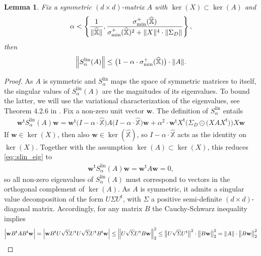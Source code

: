 \documentclass{article}
\newcommand*{\bbX}{\mathbb{X}}
\newcommand*{\bfw}{\mathbf{w}}
\newcommand*{\tran}{^{\mathsf{t}}}
\newcommand*{\sigminp}{\sigma_{\mathrm{min}}^+}
\DeclarePairedDelimiter{\abs}{\lvert}{\rvert}
\DeclarePairedDelimiter{\norm}{\lVert}{\rVert}
\newcommand{\whbbX}{\widehat{\bbX}}
\newcommand{\Slin}{S^{\mathrm{lin}}}
\newtheorem{lemma}{Lemma}[section]
\begin{document}
\begin{lemma}
  \label{lem::lin_op_bound}
  Fix a symmetric $(d \times d)$-matrix $A$ with $\ker(X) \subset \ker(A)$ and
  \begin{align*}
    \alpha < \left\{\dfrac{1}{\norm{\whbbX}},
    \dfrac{\sigminp(\whbbX)}{\sigminp(\whbbX)^2 + \norm{X}^4 \cdot
    \norm{\Sigma_D}}\right\},
  \end{align*} then \begin{align*}
    \norm[\Big]{\Slin_{\alpha}(A)} \leq \big(1 - \alpha \cdot
    \sigminp(\whbbX)\big) \cdot \norm{A}.
  \end{align*}
\end{lemma}

\begin{proof}
  As $A$ is symmetric and $\Slin_\alpha$ maps the space of symmetric matrices to
  itself, the singular values of $\Slin_\alpha(A)$ are the magnitudes of its
  eigenvalues. To bound the latter, we will use the variational characterization
  of the eigenvalues, see Theorem 4.2.6 in \cite{horn_johnson_2013}. Fix a
  non-zero unit vector $\bfw$. The definition of $\Slin_\alpha$ entails
  \begin{align}
    \label{eq::slin_eig}
    \bfw\tran \Slin_\alpha(A) \bfw = \bfw\tran \big(I - \alpha \cdot \whbbX\big)
    A \big(I - \alpha \cdot \whbbX\big) \bfw + \alpha^2 \cdot \bfw\tran X\tran
    \Big(\Sigma_D \odot \big(X A X\tran\big)\Big) X \bfw
  \end{align} If $\bfw \in \ker(X)$, then also $\bfw \in \ker(\whbbX)$, so $I -
  \alpha \cdot \whbbX$ acts as the identity on $\ker(X)$. Together with the
  assumption $\ker(A) \subset \ker(X)$, this reduces \eqref{eq::slin_eig} to
  \begin{align}
    \label{eq::slin_ker}
    \bfw\tran \Slin_\alpha(A) \bfw = \bfw\tran A \bfw = 0,
  \end{align} so all non-zero eigenvalues of $\Slin_\alpha(A)$ must correspond
  to vectors in the orthogonal complement of $\ker(A)$. As $A$ is symmetric, it
  admits a singular value decomposition of the form $U \Sigma U\tran$, with
  $\Sigma$ a positive semi-definite $(d \times d)$-diagonal matrix. Accordingly,
  for any matrix $B$ the Cauchy-Schwarz inequality implies \begin{align*}
    \abs[\Big]{\bfw B\tran A B\tran \bfw} = \abs[\Big]{\bfw B\tran U
    \sqrt{\Sigma} U\tran U \sqrt{\Sigma} U\tran B\tran \bfw} \leq \norm[\Big]{U
    \sqrt{\Sigma} U\tran B \bfw}_2^2 \leq \norm[\big]{U \sqrt{\Sigma} U\tran}^2
    \cdot \norm[\big]{B \bfw}_2^2 = \norm{A} \cdot \norm[\big]{B \bfw}_2^2

\end{align*}
\end{proof}
\end{document}
